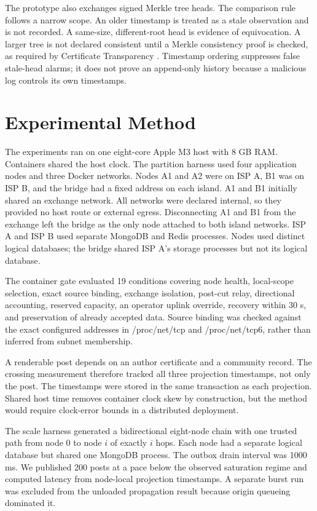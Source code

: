 \documentclass[conference,a4paper]{IEEEtran}
\begin{document}
The prototype also exchanges signed Merkle tree heads. The comparison rule follows a narrow scope.
An older timestamp is treated as a stale observation and is not recorded. A same-size,
different-root head is evidence of equivocation. A larger tree is not declared consistent until a
Merkle consistency proof is checked, as required by Certificate Transparency
\cite{rfc9162}. Timestamp ordering suppresses false stale-head alarms; it does not prove an
append-only history because a malicious log controls its own timestamps.

\section{Experimental Method}

The experiments ran on one eight-core Apple M3 host with 8 GB RAM. Containers shared the host clock.
The partition harness used four application nodes and three Docker networks. Nodes A1 and A2 were on
ISP A, B1 was on ISP B, and the bridge had a fixed address on each island. A1 and B1 initially shared
an exchange network. All networks were declared internal, so they provided no host route or external
egress. Disconnecting A1 and B1 from the exchange left the bridge as the only node attached to both
island networks. ISP A and ISP B used separate MongoDB and Redis processes. Nodes used distinct
logical databases; the bridge shared ISP A's storage processes but not its logical database.

The container gate evaluated 19 conditions covering node health, local-scope selection, exact source
binding, exchange isolation, post-cut relay, directional accounting, reserved capacity, an operator
uplink override, recovery within 30 s, and preservation of already accepted data. Source binding was
checked against the exact configured addresses in /proc/net/tcp and
/proc/net/tcp6, rather than inferred from subnet membership.

A renderable post depends on an author certificate and a community record. The crossing measurement
therefore tracked all three projection timestamps, not only the post. The timestamps were stored in
the same transaction as each projection. Shared host time removes container clock skew by
construction, but the method would require clock-error bounds in a distributed deployment.

The scale harness generated a bidirectional eight-node chain with one trusted path from node 0 to
node $i$ of exactly $i$ hops. Each node had a separate logical database but shared one MongoDB
process. The outbox drain interval was 1000 ms. We published 200 posts at a pace below the observed
saturation regime and computed latency from node-local projection timestamps. A separate burst run
was excluded from the unloaded propagation result because origin queueing dominated it.
\end{document}
